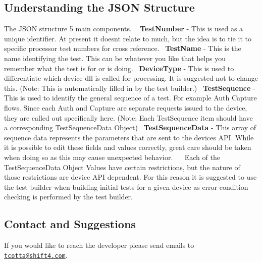 \subsection*{Understanding the J\+S\+ON Structure}

 The J\+S\+ON structure 5 main components. ~\newline
 {\bfseries Test\+Number} -\/ This is used as a unique identifier. At present it doesn\textquotesingle{}t relate to much, but the idea is to tie it to specific processor test numbers for cross reference.~\newline
 {\bfseries Test\+Name} -\/ This is the name identifying the test. This can be whatever you like that helps you remember what the test is for or is doing.~\newline
 {\bfseries Device\+Type} -\/ This is used to differentiate which device dll is called for processing. It is suggested not to change this. (Note\+: This is automatically filled in by the test builder.)~\newline
 {\bfseries Test\+Sequence} -\/ This is used to identify the general sequence of a test. For example Auth Capture flows. Since each Auth and Capture are separate requests issued to the device, they are called out specifically here. (Note\+: Each Test\+Sequence item should have a corresponding Test\+Sequence\+Data Object)~\newline
 {\bfseries Test\+Sequence\+Data} -\/ This array of sequence data represents the parameters that are sent to the device\textquotesingle{}s A\+PI. While it is possible to edit these fields and values correctly, great care should be taken when doing so as this may cause unexpected behavior.~\newline
 ~\newline
 Each of the Test\+Sequence\+Data Object Values have certain restrictions, but the nature of those restrictions are device A\+PI dependent. For this reason it is suggested to use the test builder when building initial tests for a given device as error condition checking is performed by the test builder.~\newline


\subsection*{Contact and Suggestions}

If you would like to reach the developer please send emails to \href{mailto:tcotta@shift4.com}{\tt tcotta@shift4.\+com}.

